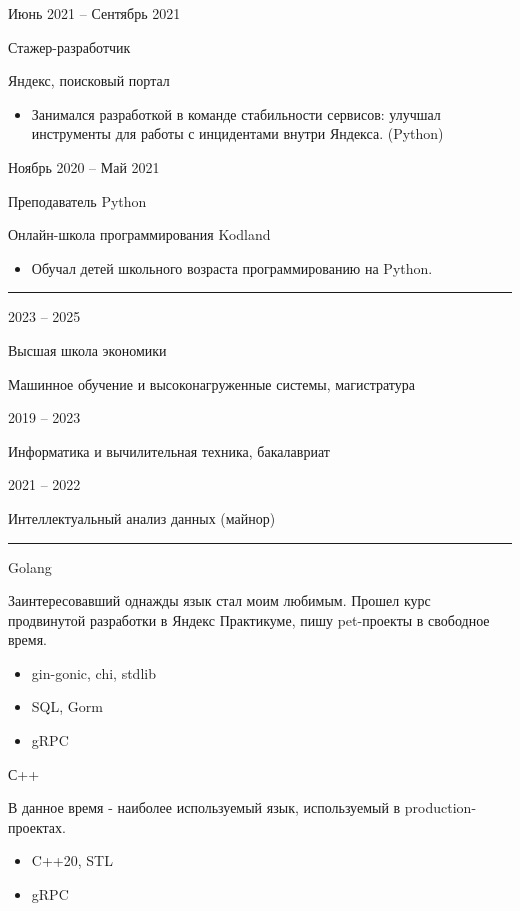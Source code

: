 \documentclass[a4paper,10pt]{article}
\newlength{\cvcolumngapwidth}
\newlength{\cvleftcolumnwidth}
\newlength{\cvrightcolumnwidth}
\newcommand{\cvsectionstyle}[1]{{\normalsize\cvsectionfont\textcolor{cvsectioncolor}{#1}}}
\newcommand{\cvtitlestyle}[1]{{\large\cvtitlefont\textcolor{cvtitlecolor}{#1}}}
\newcommand{\cvdurationstyle}[1]{{\small\cvdurationfont\textcolor{cvdurationcolor}{#1}}}
\newcommand{\cvheadingstyle}[1]{{\normalsize\cvheadingfont\textcolor{cvheadingcolor}{#1}}}
\newlength{\cvafteritemskipamount}
\newlength{\cvaftersectionskipamount}
\newlength{\cvbetweensectionandheadingextraskipamount}
\newlength{\cvaftertitleskipamount}
\newlength{\cvparskip}
\newcommand{\cvsection}[1]{
    \begin{minipage}[t]{\cvleftcolumnwidth}
        \raggedleft\cvsectionstyle{#1}
    \end{minipage}%
    \hspace{\cvcolumngapwidth}%
    \begin{minipage}[t]{\cvrightcolumnwidth}
        \textcolor{cvrulecolor}{\rule{\cvrightcolumnwidth}{0.3mm}}
    \end{minipage}

    \vspace{\cvaftersectionskipamount}
}
\newcommand{\cvitem}[2]{
    \begin{minipage}[t]{\cvleftcolumnwidth}
        \raggedleft #1
    \end{minipage}%
    \hspace{\cvcolumngapwidth}%
    \begin{minipage}[t]{\cvrightcolumnwidth}
        \setlength{\parskip}{\cvparskip} #2
    \end{minipage}

    \vspace{\cvafteritemskipamount}
}
\newcommand{\cvtitle}[1]{
    \cvtitlestyle{#1}

    \vspace{\cvaftertitleskipamount}
    \vspace{-\cvparskip}
}
\begin{document}
\cvitem{
    \cvdurationstyle{Июнь 2021 -- Сентябрь 2021}
}{
    \cvtitle{Стажер-разработчик}

    Яндекс, поисковый портал

    \begin{itemize}[leftmargin=*]
        \item Занимался разработкой в команде стабильности сервисов: улучшал инструменты для работы с инцидентами внутри Яндекса. (Python)
    \end{itemize}
}

\cvitem{
    \cvdurationstyle{Ноябрь 2020 -- Май 2021}
}{
    \cvtitle{Преподаватель Python}

    Онлайн-школа программирования Kodland

    \begin{itemize}[leftmargin=*]
        \item Обучал детей школьного возраста программированию на Python.
    \end{itemize}
}



\cvsection{Образование}

\cvitem{
    \cvdurationstyle{2023 -- 2025}
}{
    \cvtitle{Высшая школа экономики}

    Машинное обучение и высоконагруженные системы, магистратура
}

\cvitem{
    \cvdurationstyle{2019 -- 2023}
}{
    Информатика и вычилительная техника, бакалавриат
}

\cvitem{
    \cvdurationstyle{2021 -- 2022}
}{
    Интеллектуальный анализ данных (майнор)
}


\cvsection{Навыки}

\vspace{\cvbetweensectionandheadingextraskipamount}

\cvitem{
    \cvheadingstyle{Golang}
}{
    Заинтересовавший однажды язык стал моим любимым. Прошел курс продвинутой разработки в Яндекс Практикуме, пишу pet-проекты в свободное время.
    \begin{itemize}
        \item gin-gonic, chi, stdlib
        \item SQL, Gorm
        \item gRPC
    \end{itemize}
}

\cvitem{
    \cvheadingstyle{С++}
}{
    В данное время - наиболее используемый язык, используемый в production-проектах.
    \begin{itemize}
        \item C++20, STL
        \item gRPC
    \end{itemize}
}
\end{document}

